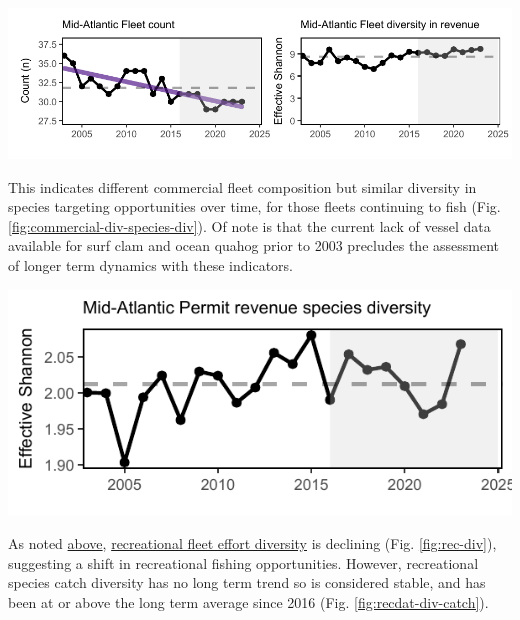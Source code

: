 \documentclass[
  10pt,
]{article}
\let\origfigure\figure
\let\endorigfigure\endfigure
\renewenvironment{figure}[1][2] {
    \expandafter\origfigure\expandafter[H]
} {
    \endorigfigure
}
\begin{document}
\begin{figure}

{\centering \includegraphics{midatlantic_files/figure-latex/comm-div-fleet-1} 

}

\caption{Commercial fleet count (left) and fleet diversity in revenue (right) in the Mid-Atlantic (black) with significant decline in fleet count (purple line).}\label{fig:comm-div-fleet}
\end{figure}

This indicates different commercial fleet composition but similar diversity in species targeting opportunities over time, for those fleets continuing to fish (Fig. \ref{fig:commercial-div-species-div}). Of note is that the current lack of vessel data available for surf clam and ocean quahog prior to 2003 precludes the assessment of longer term dynamics with these indicators.

\begin{figure}

{\centering \includegraphics{midatlantic_files/figure-latex/commercial-div-species-div-1} 

}

\caption{Species revenue diversity in the Mid Atlantic.}\label{fig:commercial-div-species-div}
\end{figure}

As noted \hyperref[recreational-opportunities]{above}, \href{https://noaa-edab.github.io/catalog/recdat.html}{recreational fleet effort diversity} is declining (Fig. \ref{fig:rec-div}), suggesting a shift in recreational fishing opportunities. However, recreational species catch diversity has no long term trend so is considered stable, and has been at or above the long term average since 2016 (Fig. \ref{fig:recdat-div-catch}).
\end{document}

